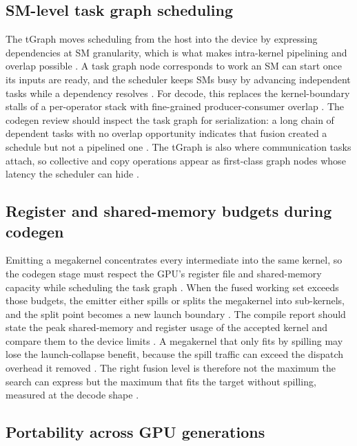 \subsection{SM-level task graph scheduling}

The tGraph moves scheduling from the host into the device by expressing dependencies at SM granularity, which is what makes intra-kernel pipelining and overlap possible \citep{mpk2025}. A task graph node corresponds to work an SM can start once its inputs are ready, and the scheduler keeps SMs busy by advancing independent tasks while a dependency resolves \citep{mpk2025,taxbreak2026}. For decode, this replaces the kernel-boundary stalls of a per-operator stack with fine-grained producer-consumer overlap \citep{mpk2025,memoryfloor2026}. The codegen review should inspect the task graph for serialization: a long chain of dependent tasks with no overlap opportunity indicates that fusion created a schedule but not a pipelined one \citep{patel2025llminference,mpk2025}. The tGraph is also where communication tasks attach, so collective and copy operations appear as first-class graph nodes whose latency the scheduler can hide \citep{mpk2025,semianalysis2024tma}.

\subsection{Register and shared-memory budgets during codegen}

Emitting a megakernel concentrates every intermediate into the same kernel, so the codegen stage must respect the GPU's register file and shared-memory capacity while scheduling the task graph \citep{mpk2025,nvidia2022hopper}. When the fused working set exceeds those budgets, the emitter either spills or splits the megakernel into sub-kernels, and the split point becomes a new launch boundary \citep{memoryfloor2026,taxbreak2026}. The compile report should state the peak shared-memory and register usage of the accepted kernel and compare them to the device limits \citep{wu2024mirage,patel2025llminference}. A megakernel that only fits by spilling may lose the launch-collapse benefit, because the spill traffic can exceed the dispatch overhead it removed \citep{memoryfloor2026,mpk2025}. The right fusion level is therefore not the maximum the search can express but the maximum that fits the target without spilling, measured at the decode shape \citep{nvidia2022hopper,memoryfloor2026}.

\subsection{Portability across GPU generations}

